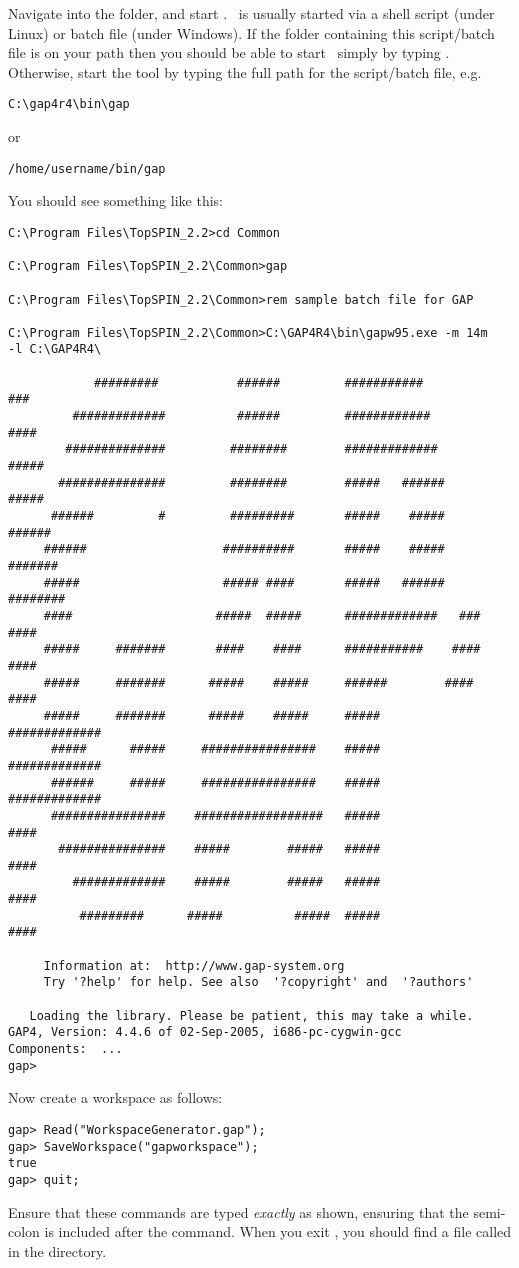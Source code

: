 Navigate into the  folder, and start \gap.  \gap\ is
usually started via a shell script (under Linux) or batch file (under
Windows).  If the folder containing this script/batch file is on your
path then you should be able to start \gap\ simply by typing .
Otherwise, start the tool by typing the full path for the script/batch file,
e.g.
%
\begin{lstlisting}
C:\gap4r4\bin\gap
\end{lstlisting}
%
or
\begin{lstlisting}
/home/username/bin/gap
\end{lstlisting}
%
You should see something like this:
%
\begin{lstlisting}
C:\Program Files\TopSPIN_2.2>cd Common

C:\Program Files\TopSPIN_2.2\Common>gap

C:\Program Files\TopSPIN_2.2\Common>rem sample batch file for GAP

C:\Program Files\TopSPIN_2.2\Common>C:\GAP4R4\bin\gapw95.exe -m 14m
-l C:\GAP4R4\

            #########           ######         ###########           ###
         #############          ######         ############         ####
        ##############         ########        #############       #####
       ###############         ########        #####   ######      #####
      ######         #         #########       #####    #####     ######
     ######                   ##########       #####    #####    #######
     #####                    ##### ####       #####   ######   ########
     ####                    #####  #####      #############   ###  ####
     #####     #######       ####    ####      ###########    ####  ####
     #####     #######      #####    #####     ######        ####   ####
     #####     #######      #####    #####     #####         #############
      #####      #####     ################    #####         #############
      ######     #####     ################    #####         #############
      ################    ##################   #####                ####
       ###############    #####        #####   #####                ####
         #############    #####        #####   #####                ####
          #########      #####          #####  #####                ####

     Information at:  http://www.gap-system.org
     Try '?help' for help. See also  '?copyright' and  '?authors'

   Loading the library. Please be patient, this may take a while.
GAP4, Version: 4.4.6 of 02-Sep-2005, i686-pc-cygwin-gcc
Components:  ...
gap>
\end{lstlisting}
%
Now create a workspace as follows:
%
\begin{lstlisting}
gap> Read("WorkspaceGenerator.gap");
gap> SaveWorkspace("gapworkspace");
true
gap> quit;
\end{lstlisting}
%
Ensure that these commands are typed \emph{exactly} as shown,
ensuring that the semi-colon is included after the 
command.  When you exit \gap, you should find a file called
 in the  directory.
%
